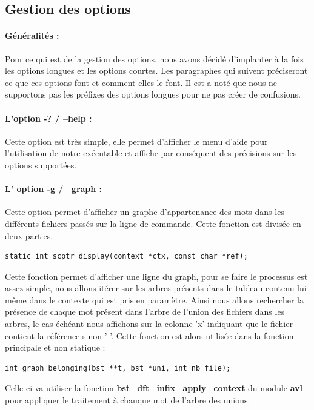 \documentclass{article}
\begin{document}
\subsection{Gestion des options}
\paragraph{Généralités :}
Pour ce qui est de la gestion des options, nous avons décidé d'implanter à la fois les options longues et les options courtes.
Les paragraphes qui suivent préciseront ce que ces options font et comment elles le font. Il est a noté que nous ne supportons pas
les préfixes des options longues pour ne pas créer de confusions.

\paragraph{L'option -? / --help :}
Cette option est très simple, elle permet d'afficher le menu d'aide pour l'utilisation 
de notre exécutable et affiche par conséquent des précisions sur les options supportées.

\paragraph{L' option -g / --graph :}
Cette option permet d'afficher un graphe d'appartenance des mots dans les différents 
fichiers passés sur la ligne de commande. Cette fonction est divisée en deux parties.

\begin{lstlisting}[style=Cstyle]
  static int scptr_display(context *ctx, const char *ref); 
\end{lstlisting}
Cette fonction permet d'afficher une ligne du graph, pour se faire le processus est assez simple,
nous allons itérer sur les arbres présents dans le tableau contenu lui-même dans le contexte qui est pris en paramètre.
Ainsi nous allons rechercher la présence de chaque mot présent dans l'arbre de l'union des fichiers dans les arbres, 
le cas échéant nous affichons sur la colonne 'x' indiquant que le fichier contient la référence sinon '-'.
Cette fonction est alors utilisée dans la fonction principale et non statique :
\begin{lstlisting}[style=Cstyle]
  int graph_belonging(bst **t, bst *uni, int nb_file); 
\end{lstlisting}
Celle-ci va utiliser la fonction \textbf{bst\_dft\_infix\_apply\_context} du module \textbf{avl} pour appliquer le traitement
à chauque mot de l'arbre des unions.
\end{document}
